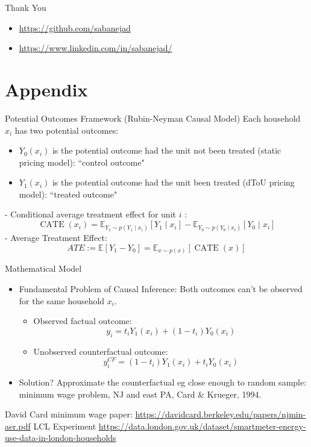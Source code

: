 \documentclass{beamer}
\begin{document}
\begin{frame}{Thank You}
  \begin{itemize}
  \item \url{https://github.com/sabanejad}
  \item \url{https://www.linkedin.com/in/sabanejad/}
  \end{itemize}
\end{frame}

\section{Appendix}

\begin{frame}{Potential Outcomes Framework (Rubin-Neyman Causal Model)}
  Each household $x_i$ has two potential outcomes:
  \begin{itemize}
    \item $Y_0\left(x_i\right)$ is the potential outcome had the unit not been treated (static pricing model): ``control outcome"
    \item $Y_1\left(x_i\right)$ is the potential outcome had the unit been treated (dToU pricing model): ``treated outcome"
  \end{itemize}
  - Conditional average treatment effect for unit $i$ :
  $$
  \operatorname{CATE}\left(x_i\right)=\mathbb{E}_{Y_1 \sim p\left(Y_1 \mid x_i\right)}\left[Y_1 \mid x_i\right]-\mathbb{E}_{Y_0 \sim p\left(Y_0 \mid x_i\right)}\left[Y_0 \mid x_i\right]
  $$
  - Average Treatment Effect:
  $$
  A T E:=\mathbb{E}\left[Y_1-Y_0\right]=\mathbb{E}_{x \sim p(x)}[\operatorname{CATE}(x)]
  $$
\end{frame}

\begin{frame}{Mathematical Model}
\begin{itemize}
  \item Fundamental Problem of Causal Inference: Both outcomes can't be observed for the same household $x_i$.
  \begin{itemize}
    \item Observed factual outcome:
    $$
    y_i=t_i Y_1\left(x_i\right)+\left(1-t_i\right) Y_0\left(x_i\right)
    $$
    \item Unobserved counterfactual outcome:
    $$
    y_i^{C F}=\left(1-t_i\right) Y_1\left(x_i\right)+t_i Y_0\left(x_i\right)
    $$
  \end{itemize}
  \item Solution? Approximate the counterfactual eg close enough to random sample: minimum wage problem, NJ and east PA, Card \& Krueger, 1994.
\end{itemize}
\end{frame}

\begin{frame}
  David Card minimum wage paper: \url{https://davidcard.berkeley.edu/papers/njmin-aer.pdf}
  LCL Experiment \url{https://data.london.gov.uk/dataset/smartmeter-energy-use-data-in-london-households}
\end{frame}
\end{document}
